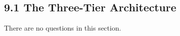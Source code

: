 \documentclass[../../main.tex]{subfiles}
\begin{document}
\subsection{9.1 The Three-Tier Architecture}

There are no questions in this section.
\end{document}
